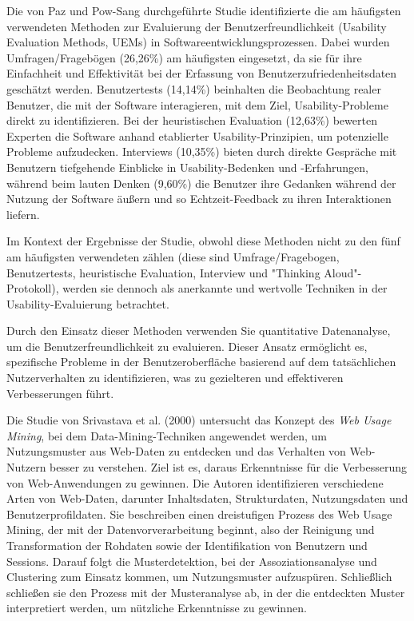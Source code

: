 \documentclass[12pt,oneside]{article}
\begin{document}
Die von Paz und Pow-Sang durchgeführte Studie \cite{Paz2016} identifizierte die am häufigsten verwendeten Methoden zur Evaluierung der Benutzerfreundlichkeit (Usability Evaluation Methods, UEMs) in Softwareentwicklungsprozessen. Dabei wurden Umfragen/Fragebögen (26,26\%) am häufigsten eingesetzt, da sie für ihre Einfachheit und Effektivität bei der Erfassung von Benutzerzufriedenheitsdaten geschätzt werden. Benutzertests (14,14\%) beinhalten die Beobachtung realer Benutzer, die mit der Software interagieren, mit dem Ziel, Usability-Probleme direkt zu identifizieren. Bei der heuristischen Evaluation (12,63\%) bewerten Experten die Software anhand etablierter Usability-Prinzipien, um potenzielle Probleme aufzudecken. Interviews (10,35\%) bieten durch direkte Gespräche mit Benutzern tiefgehende Einblicke in Usability-Bedenken und -Erfahrungen, während beim lauten Denken (9,60\%) die Benutzer ihre Gedanken während der Nutzung der Software äußern und so Echtzeit-Feedback zu ihren Interaktionen liefern.

Im Kontext der Ergebnisse der Studie, obwohl diese Methoden nicht zu den fünf am häufigsten verwendeten zählen (diese sind Umfrage/Fragebogen, Benutzertests, heuristische Evaluation, Interview und "Thinking Aloud"-Protokoll), werden sie dennoch als anerkannte und wertvolle Techniken in der Usability-Evaluierung betrachtet.

Durch den Einsatz dieser Methoden verwenden Sie quantitative Datenanalyse, um die Benutzerfreundlichkeit zu evaluieren. Dieser Ansatz ermöglicht es, spezifische Probleme in der Benutzeroberfläche basierend auf dem tatsächlichen Nutzerverhalten zu identifizieren, was zu gezielteren und effektiveren Verbesserungen führt.

Die Studie von Srivastava et al. (2000)\cite{Srivastava2000} untersucht das Konzept des \textit{Web Usage Mining}, bei dem Data-Mining-Techniken angewendet werden, um Nutzungsmuster aus Web-Daten zu entdecken und das Verhalten von Web-Nutzern besser zu verstehen. Ziel ist es, daraus Erkenntnisse für die Verbesserung von Web-Anwendungen zu gewinnen. Die Autoren identifizieren verschiedene Arten von Web-Daten, darunter Inhaltsdaten, Strukturdaten, Nutzungsdaten und Benutzerprofildaten. Sie beschreiben einen dreistufigen Prozess des Web Usage Mining, der mit der Datenvorverarbeitung beginnt, also der Reinigung und Transformation der Rohdaten sowie der Identifikation von Benutzern und Sessions. Darauf folgt die Musterdetektion, bei der Assoziationsanalyse und Clustering zum Einsatz kommen, um Nutzungsmuster aufzuspüren. Schließlich schließen sie den Prozess mit der Musteranalyse ab, in der die entdeckten Muster interpretiert werden, um nützliche Erkenntnisse zu gewinnen.
\end{document}
